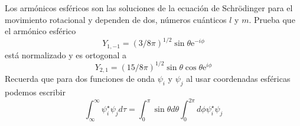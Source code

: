 \documentclass[addpoints,spanish, 12pt,a4paper]{exam}
\begin{document}
\begin{questions}
    \question[1\half] Los armónicos esféricos son las soluciones
    de la ecuación de Schrödinger para el movimiento
    rotacional y dependen de dos, números cuánticos $l$ y 
    $m$. Prueba que el armónico esférico
    \begin{equation*}
        Y_{1,-1}=(3/8\pi)^{1/2}\sin\theta\mathrm{e}^{-i\phi}
     \end{equation*}
    está normalizado y es ortogonal a    
    \begin{equation*}
        Y_{2,1}=(15/8\pi)^{1/2}\sin\theta\cos\theta\mathrm{e}^{i\phi}
    \end{equation*}
    Recuerda que para dos funciones de onda $\psi_i$ y $\psi_j$ al usar coordenadas esféricas podemos 
    escribir
    \begin{equation*}
        \int_\infty^\infty\psi_i^\star\psi_j d\tau=
    \int_0^\pi \sin\theta d\theta\int_0^{2\pi}d\phi\psi_i^\star\psi_j
    \end{equation*}
    \newpage
%    

\end{questions}
\end{document}
